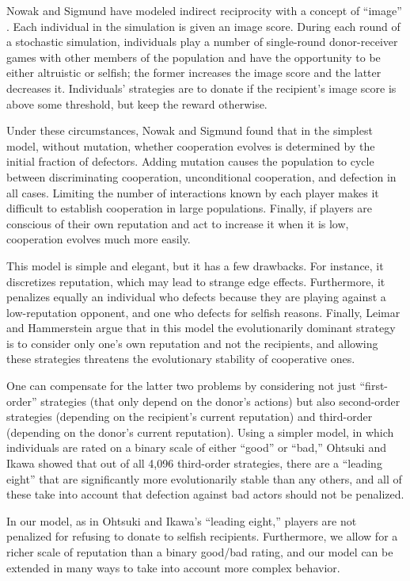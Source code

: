 \documentclass{amsart}
\begin{document}
Nowak and Sigmund have modeled indirect reciprocity with a concept of
``image'' \cite{nowak_evolution_1998}. Each individual in the
simulation is given an image score. During each round of a stochastic
simulation, individuals play a number of single-round donor-receiver
games with other members of the population and have the opportunity to
be either altruistic or selfish; the former increases the image score
and the latter decreases it. Individuals’ strategies are to donate if
the recipient’s image score is above some threshold, but keep the
reward otherwise.

Under these circumstances, Nowak and Sigmund found that in the
simplest model, without mutation, whether cooperation evolves is
determined by the initial fraction of defectors. Adding mutation
causes the population to cycle between discriminating cooperation,
unconditional cooperation, and defection in all cases. Limiting the
number of interactions known by each player makes it difficult to
establish cooperation in large populations. Finally, if players are
conscious of their own reputation and act to increase it when it is
low, cooperation evolves much more easily.

This model is simple and elegant, but it has a few drawbacks. For
instance, it discretizes reputation, which may lead to strange edge
effects. Furthermore, it penalizes equally an individual who defects
because they are playing against a low-reputation opponent, and one
who defects for selfish reasons. Finally, Leimar and Hammerstein
\cite{leimar_evolution_2001} argue that in this model the
evolutionarily dominant strategy is to consider only one's own
reputation and not the recipients, and allowing these strategies
threatens the evolutionary stability of cooperative ones.

One can compensate for the latter two problems by considering not just
``first-order'' strategies (that only depend on the donor's actions)
but also second-order strategies (depending on the recipient's current
reputation) and third-order (depending on the donor's current
reputation).  Using a simpler model, in which individuals are rated on
a binary scale of either ``good'' or ``bad,'' Ohtsuki and Ikawa
\cite{ohtsuki_how_2004} showed that out of all 4,096 third-order
strategies, there are a ``leading eight'' that are significantly more
evolutionarily stable than any others, and all of these take into
account that defection against bad actors should not be penalized.

In our model, as in Ohtsuki and Ikawa's ``leading eight,'' players are
not penalized for refusing to donate to selfish recipients.
Furthermore, we allow for a richer scale of reputation than a binary
good/bad rating, and our model can be extended in many ways to take
into account more complex behavior.
\end{document}
